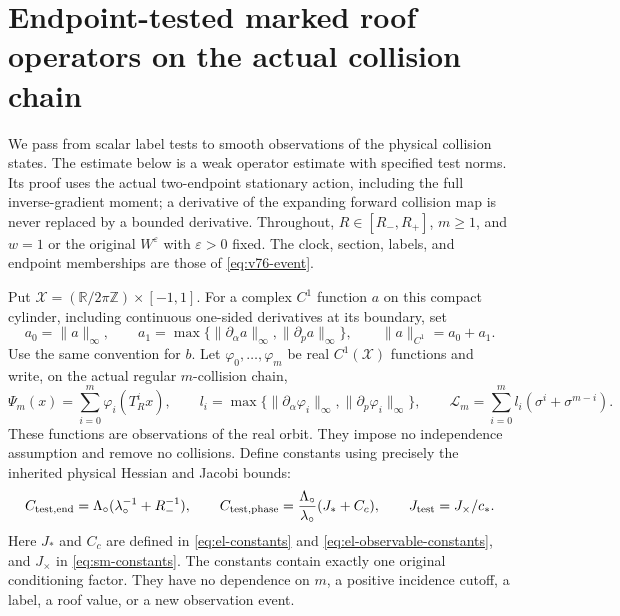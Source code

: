 \section{Endpoint-tested marked roof operators on the actual collision chain}
\label{sec:wo-endpoint-tests}

We pass from scalar label tests to smooth observations of the physical
collision states.  The estimate below is a weak operator estimate with
specified test norms.  Its proof uses the actual two-endpoint stationary
action, including the full inverse-gradient moment; a derivative of the
expanding forward collision map is never replaced by a bounded derivative.
Throughout, $R\in[R_-,R_+]$, $m\ge1$, and $w=1$ or the original
$W^\varepsilon$ with $\varepsilon>0$ fixed.  The clock, section, labels,
and endpoint memberships are those of \eqref{eq:v76-event}.

Put $\mathcal X=(\mathbb R/2\pi\mathbb Z)\times[-1,1]$.  For a complex
$C^1$ function $a$ on this compact cylinder, including continuous
one-sided derivatives at its boundary, set
\begin{equation}\label{eq:wo-test-norm}
 a_0=\|a\|_\infty,\qquad
 a_1=\max\{\|\partial_\alpha a\|_\infty,
                         \|\partial_p a\|_\infty\},\qquad
 \|a\|_{C^1}=a_0+a_1.
\end{equation}
Use the same convention for $b$.  Let
$\varphi_0,\ldots,\varphi_m$ be real $C^1(\mathcal X)$ functions and
write, on the actual regular $m$-collision chain,
\begin{equation}\label{eq:wo-phase}
 \Psi_m(x)=\sum_{i=0}^m\varphi_i(T_R^ix),\qquad
 l_i=\max\{\|\partial_\alpha\varphi_i\|_\infty,
                    \|\partial_p\varphi_i\|_\infty\},\qquad
 \mathcal L_m=\sum_{i=0}^m l_i(\sigma^i+\sigma^{m-i}).
\end{equation}
These functions are observations of the real orbit.  They impose no
independence assumption and remove no collisions.  Define constants
using precisely the inherited physical Hessian and Jacobi bounds:
\begin{equation}\label{eq:wo-constants}
 C_{\rm test,end}=\Lambda_\circ(\lambda_\circ^{-1}+R_-^{-1}),\qquad
 C_{\rm test,phase}=\frac{\Lambda_\circ}{\lambda_\circ}(J_*+C_c),\qquad
 J_{\rm test}=J_\times/c_*.
\end{equation}
Here $J_*$ and $C_c$ are defined in \eqref{eq:el-constants} and
\eqref{eq:el-observable-constants}, and $J_\times$ in
\eqref{eq:sm-constants}.  The constants contain exactly one original
conditioning factor.  They have no dependence on $m$, a positive
incidence cutoff, a label, a roof value, or a new observation event.

